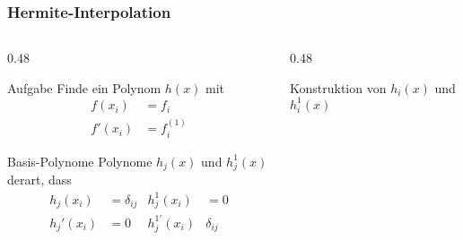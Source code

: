 %
%
%
\begin{frame}
\frametitle{Hermite-Interpolation}
\vspace{-15pt}
\begin{columns}[t]
\begin{column}{0.48\hsize}
\begin{block}{Aufgabe}
Finde ein Polynom $h(x)$ mit
\begin{align*}
f(x_i) &= f_i \\
f'(x_i) &= f_i^{(1)}
\end{align*}
\end{block}
\begin{block}{Basis-Polynome}
Polynome $h_j(x)$ und $h_j^1(x)$ derart, dass
\begin{align*}
h_j(x_i) &= \delta_{ij}  & h_j^{1}(x_i) &= 0\\
h_j'(x_i) &= 0           & h_j^{1\prime}(x_i)&\delta_{ij}
\end{align*}
\end{block}
\end{column}
\begin{column}{0.48\hsize}
\begin{block}{Konstruktion von $h_i(x)$ und $h_i^1(x)$}
\end{block}
\end{column}
\end{columns}
\end{frame}

